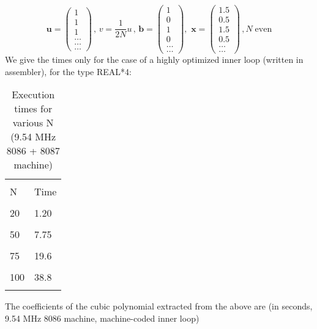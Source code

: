 \begin{equation*}
 \label{eq:09_25_}
	\mathbf{u}=
	\begin{pmatrix}
		1\\ 
		1\\ 
		1\\ 
		\dots\\ 
		\dots\\ 
		\dots
	\end{pmatrix}
	\, ,\, 
	v=\frac{1}{2N} u\, , \, 
	\mathbf{b} =
	\begin{pmatrix}
		1\\ 
		0\\ 
		1\\ 
		0\\ 
		\dots\\ 
		\dots
	\end{pmatrix}
	,\, \,  
	\mathbf{x}=
	\begin{pmatrix}
		1.5\\ 
		0.5\\ 
		1.5\\ 
		0.5\\ 
		\dots\\ 
		\dots
	\end{pmatrix}
	\, , N \; \textrm{even}
\end{equation*}
We give the times only for the case of a highly optimized inner
loop (written in assembler), for the type REAL*4:

\begin{table}
	\centering
	\caption{Execution times for various N (9.54 MHz 8086 + 8087 machine)}
	    \bigskip
    \label{tbl:09_01} 
	\setlength{\tabcolsep}{40pt}
        \begin{tabular}{|ll|}
            \hline & \\
			N   &  Time\\
			& \\
			20  &  1.20\\
			& \\
			50  &  7.75\\
			& \\
			75  &  19.6\\
			& \\
			100 &  38.8\\
            & \\
            \hline
        \end{tabular}
\end{table}

The coefficients of the cubic polynomial extracted from the above
are (in seconds, 9.54 MHz 8086 machine, machine-coded inner loop)

